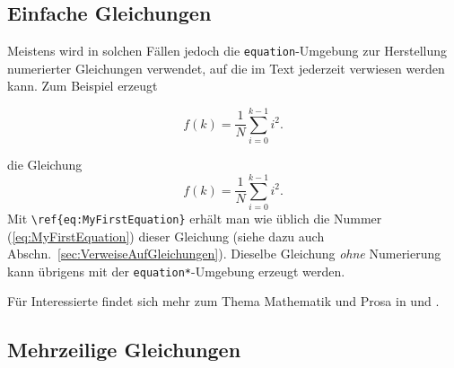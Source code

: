 \subsection{Einfache Gleichungen} 

Meistens wird in solchen Fällen jedoch die \texttt{equation}-Umgebung zur Herstellung numerierter Gleichungen verwendet, auf die im Text jederzeit verwiesen werden kann. Zum Beispiel erzeugt
%
\begin{LaTeXCode}[numbers=none]
\begin{equation}
  f(k) = \frac{1}{N} \sum_{i=0}^{k-1} i^2 . 
  \label{eq:MyFirstEquation}
\end{equation}
\end{LaTeXCode}
%
die Gleichung
%
\begin{equation}
  f(k) = \frac{1}{N} \sum_{i=0}^{k-1} i^2 . 
\label{eq:MyFirstEquation}
\end{equation}
%
Mit \verb!\ref{eq:MyFirstEquation}! erhält man wie üblich die Nummer (\ref{eq:MyFirstEquation}) dieser Gleichung (siehe dazu auch Abschn.\ \ref{sec:VerweiseAufGleichungen}). 
Dieselbe Gleichung \emph{ohne} Numerierung kann übrigens mit der \texttt{equation*}-Umgebung erzeugt werden.



\begin{center}
\setlength{\fboxrule}{0.2mm}
\setlength{\fboxsep}{2mm}
\end{center}
%
Für Interessierte findet sich mehr zum Thema Mathematik und Prosa in \cite{Mermin89} und \cite{Higham98}.

\subsection{Mehrzeilige Gleichungen}

